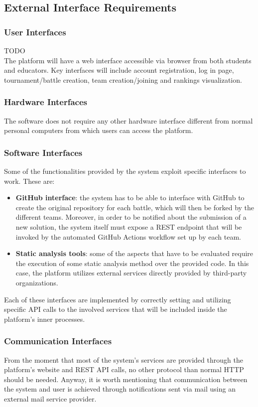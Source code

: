 \subsection{External Interface Requirements}
\subsubsection{User Interfaces}
TODO\\
The platform will have a web interface accessible via browser from both students and educators. Key interfaces will include account registration, log in page, tournament/battle creation, team creation/joining and rankings visualization.
\subsubsection{Hardware Interfaces}
The software does not require any other hardware interface different from normal personal computers from which users can access the platform.
\subsubsection{Software Interfaces}
Some of the functionalities provided by the system exploit specific interfaces to work. These are:
\begin{itemize}
    \item \textbf{GitHub interface}: the system has to be able to interface with GitHub to create the original repository for each battle, which will then be forked by the different teams. Moreover, in order to be notified about the submission of a new solution, the system itself must expose a REST endpoint that will be invoked by the automated GitHub Actions workflow set up by each team.
    \item \textbf{Static analysis tools}: some of the aspects that have to be evaluated require the execution of some static analysis method over the provided code. In this case, the platform utilizes external services directly provided by third-party organizations.
\end{itemize}
Each of these interfaces are implemented by correctly setting and utilizing specific API calls to the involved services that will be included inside the platform’s inner processes.
\subsubsection{Communication Interfaces}
From the moment that most of the system’s services are provided through the platform’s website and REST API calls, no other protocol than normal HTTP should be needed. Anyway, it is worth mentioning that communication between the system and user is achieved through notifications sent via mail using an external mail service provider.

